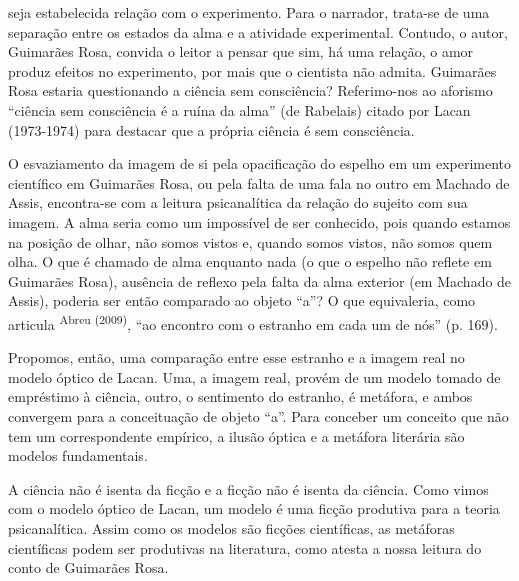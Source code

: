 \begin{multicols}{2}
seja estabelecida relação com o experimento.\allowbreak{} Para o narrador,\allowbreak{} trata-\allowbreak{}se de uma separação entre os estados da alma e a atividade experimental.\allowbreak{} Contudo,\allowbreak{} o autor,\allowbreak{} Guimarães Rosa,\allowbreak{} convida o leitor a pensar que sim,\allowbreak{} há uma relação,\allowbreak{} o amor produz efeitos no experimento,\allowbreak{} por mais que o cientista não admita.\allowbreak{} Guimarães Rosa estaria questionando a ciência sem consciência? Referimo-\allowbreak{}nos ao aforismo “ciência sem consciência é a ruína da alma” (\allowbreak{}de Rabelais)\allowbreak{} citado por Lacan (\allowbreak{}1973-\allowbreak{}1974)\allowbreak{} para destacar que a própria ciência é sem consciência.\allowbreak{}
\par{}O esvaziamento da imagem de si pela opacificação do espelho em um experimento científico em Guimarães Rosa,\allowbreak{} ou pela falta de uma fala no outro em Machado de Assis,\allowbreak{} encontra-\allowbreak{}se com a leitura psicanalítica da relação do sujeito com sua imagem.\allowbreak{} A alma seria como um impossível de ser conhecido,\allowbreak{} pois quando estamos na posição de olhar,\allowbreak{} não somos vistos e,\allowbreak{} quando somos vistos,\allowbreak{} não somos quem olha.\allowbreak{} O que é chamado de alma enquanto nada (\allowbreak{}o que o espelho não reflete em Guimarães Rosa)\allowbreak{},\allowbreak{} ausência de reflexo pela falta da alma exterior (\allowbreak{}em Machado de Assis)\allowbreak{},\allowbreak{} poderia ser então comparado ao objeto “a”? O que equivaleria,\allowbreak{} como articula \textsuperscript{Abreu (\allowbreak{}2009)\allowbreak{}},\allowbreak{} “ao encontro com o estranho em cada um de nós” (\allowbreak{}p.\allowbreak{} 169)\allowbreak{}.\allowbreak{}\par{}Propomos,\allowbreak{} então,\allowbreak{} uma comparação entre esse estranho e a imagem real no modelo óptico de Lacan.\allowbreak{} Uma,\allowbreak{} a imagem real,\allowbreak{} provém de um modelo tomado de empréstimo à ciência,\allowbreak{} outro,\allowbreak{} o sentimento do estranho,\allowbreak{} é metáfora,\allowbreak{} e ambos convergem para a conceituação de objeto “a”.\allowbreak{} Para conceber um conceito que não tem um correspondente empírico,\allowbreak{} a ilusão óptica e a metáfora literária são modelos fundamentais.\allowbreak{}\par{}A ciência não é isenta da ficção e a ficção não é isenta da ciência.\allowbreak{} Como vimos com o modelo óptico de Lacan,\allowbreak{} um modelo é uma ficção produtiva para a teoria psicanalítica.\allowbreak{} Assim como os modelos são ficções científicas,\allowbreak{} as metáforas científicas podem ser produtivas na literatura,\allowbreak{} como atesta a nossa leitura do conto de Guimarães Rosa.\allowbreak{}


\end{multicols}
